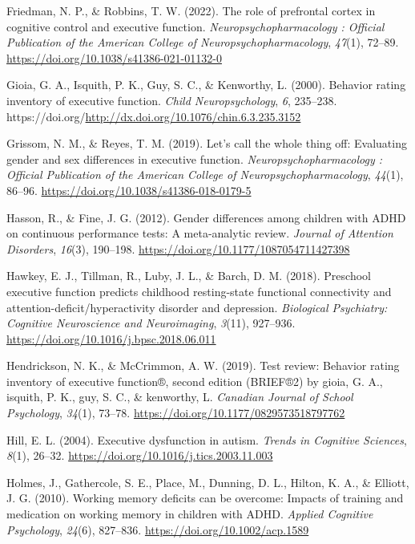 \documentclass[
  letterpaper,
]{ut-thesis}
\newlength{\cslhangindent}
\newenvironment{CSLReferences}[2] %
 {\begin{list}{}{%
  \setlength{\itemindent}{0pt}
  \setlength{\leftmargin}{0pt}
  \setlength{\parsep}{0pt}
  \ifodd #1
   \setlength{\leftmargin}{\cslhangindent}
   \setlength{\itemindent}{-1\cslhangindent}
  \fi
  \setlength{\itemsep}{#2\baselineskip}}}
 {\end{list}}
\begin{document}
\begin{CSLReferences}{1}{0}
Friedman, N. P., \& Robbins, T. W. (2022). The role of prefrontal cortex
in cognitive control and executive function.
\emph{Neuropsychopharmacology : Official Publication of the American
College of Neuropsychopharmacology}, \emph{47}(1), 72--89.
\url{https://doi.org/10.1038/s41386-021-01132-0}

Gioia, G. A., Isquith, P. K., Guy, S. C., \& Kenworthy, L. (2000).
Behavior rating inventory of executive function. \emph{Child
Neuropsychology}, \emph{6}, 235--238.
https://doi.org/\url{http://dx.doi.org/10.1076/chin.6.3.235.3152}

Grissom, N. M., \& Reyes, T. M. (2019). Let's call the whole thing off:
Evaluating gender and sex differences in executive function.
\emph{Neuropsychopharmacology : Official Publication of the American
College of Neuropsychopharmacology}, \emph{44}(1), 86--96.
\url{https://doi.org/10.1038/s41386-018-0179-5}

Hasson, R., \& Fine, J. G. (2012). Gender differences among children
with {ADHD} on continuous performance tests: A meta-analytic review.
\emph{Journal of Attention Disorders}, \emph{16}(3), 190--198.
\url{https://doi.org/10.1177/1087054711427398}

Hawkey, E. J., Tillman, R., Luby, J. L., \& Barch, D. M. (2018).
Preschool executive function predicts childhood resting-state functional
connectivity and attention-deficit/hyperactivity disorder and
depression. \emph{Biological Psychiatry: Cognitive Neuroscience and
Neuroimaging}, \emph{3}(11), 927--936.
\url{https://doi.org/10.1016/j.bpsc.2018.06.011}

Hendrickson, N. K., \& McCrimmon, A. W. (2019). Test review: {Behavior}
rating inventory of executive function®, second edition ({BRIEF}®2) by
gioia, {G}. {A}., isquith, {P}. {K}., guy, {S}. {C}., \& kenworthy, {L}.
\emph{Canadian Journal of School Psychology}, \emph{34}(1), 73--78.
\url{https://doi.org/10.1177/0829573518797762}

Hill, E. L. (2004). Executive dysfunction in autism. \emph{Trends in
Cognitive Sciences}, \emph{8}(1), 26--32.
\url{https://doi.org/10.1016/j.tics.2003.11.003}

Holmes, J., Gathercole, S. E., Place, M., Dunning, D. L., Hilton, K. A.,
\& Elliott, J. G. (2010). Working memory deficits can be overcome:
{Impacts} of training and medication on working memory in children with
{ADHD}. \emph{Applied Cognitive Psychology}, \emph{24}(6), 827--836.
\url{https://doi.org/10.1002/acp.1589}


\end{CSLReferences}
\end{document}
